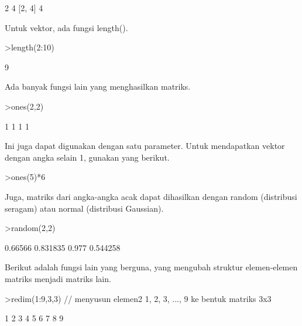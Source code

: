 \documentclass[12pt,arial,letterpaper]{book}
\begin{document}
\begin{eulercomment}
\begin{eulercomment}
\begin{eulercomment}
\begin{eulercomment}
\begin{euleroutput}
  2
  4
  [2,  4]
  4
\end{euleroutput}
\begin{eulercomment}
Untuk vektor, ada fungsi length().
\end{eulercomment}
\begin{eulerprompt}
>length(2:10)
\end{eulerprompt}
\begin{euleroutput}
  9
\end{euleroutput}
\begin{eulercomment}
Ada banyak fungsi lain yang menghasilkan matriks.
\end{eulercomment}
\begin{eulerprompt}
>ones(2,2)
\end{eulerprompt}
\begin{euleroutput}
              1             1 
              1             1 
\end{euleroutput}
\begin{eulercomment}
Ini juga dapat digunakan dengan satu parameter. Untuk mendapatkan
vektor dengan angka selain 1, gunakan yang berikut.
\end{eulercomment}
\begin{eulerprompt}
>ones(5)*6
\end{eulerprompt}
\begin{euleroutput}
  [6,  6,  6,  6,  6]
\end{euleroutput}
\begin{eulercomment}
Juga, matriks dari angka-angka acak dapat dihasilkan dengan random
(distribusi seragam) atau normal (distribusi Gaussian).
\end{eulercomment}
\begin{eulerprompt}
>random(2,2)
\end{eulerprompt}
\begin{euleroutput}
        0.66566      0.831835 
          0.977      0.544258 
\end{euleroutput}
\begin{eulercomment}
Berikut adalah fungsi lain yang berguna, yang mengubah struktur
elemen-elemen matriks menjadi matriks lain.
\end{eulercomment}
\begin{eulerprompt}
>redim(1:9,3,3) // menyusun elemen2 1, 2, 3, ..., 9 ke bentuk matriks 3x3
\end{eulerprompt}
\begin{euleroutput}
              1             2             3 
              4             5             6 
              7             8             9 

\end{euleroutput}
\end{eulercomment}
\end{eulercomment}
\end{eulercomment}
\end{eulercomment}
\end{document}
